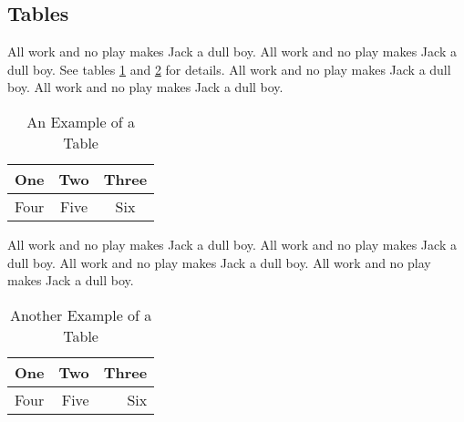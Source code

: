 
%
%

%
%

\subsection{Tables}
\label{sec:discussion_tables}

All work and no play makes Jack a dull boy.
All work and no play makes Jack a dull boy.
See tables
\ref{tab:table_a} and
\ref{tab:table_b} for details.
All work and no play makes Jack a dull boy.
All work and no play makes Jack a dull boy.

\begin{table}[ht]
\caption{An Example of a Table}
\label{tab:table_a}
\begin{center}
\begin{tabular}{|c||c|c|}
\hline
One & Two & Three\\
\hline
Four & Five & Six\\
\hline
\end{tabular}
\end{center}
\end{table}

All work and no play makes Jack a dull boy.
All work and no play makes Jack a dull boy.
All work and no play makes Jack a dull boy.
All work and no play makes Jack a dull boy.

\begin{table}[ht]
\caption{Another Example of a Table}
\label{tab:table_b}
\begin{center}
\begin{tabular}{lrr}
\hline
One & Two & Three\\
\hline
Four & Five & Six\\
\hline
\end{tabular}
\end{center}
\end{table}
